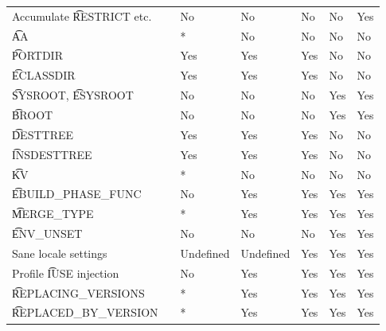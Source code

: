 \begin{landscape}
\begin{longtable}{llP{7.5em}P{7.5em}P{7.5em}P{7.5em}P{7.5em}}
Accumulate \t{RESTRICT} etc. &  &
    No & No & No & No & Yes \\

\t{AA} &  &
    * & No & No & No & No \\

\t{PORTDIR} &  &
    Yes & Yes & Yes & No & No \\

\t{ECLASSDIR} &  &
    Yes & Yes & Yes & No & No \\

\t{SYSROOT}, \t{ESYSROOT} &  &
    No & No & No & Yes & Yes \\

\t{BROOT} &  &
    No & No & No & Yes & Yes \\

\t{DESTTREE} &  &
    Yes & Yes & Yes & No & No \\

\t{INSDESTTREE} &  &
    Yes & Yes & Yes & No & No \\

\t{KV} &  &
    * & No & No & No & No \\

\t{EBUILD_PHASE_FUNC} &  &
    No & Yes & Yes & Yes & Yes \\

\t{MERGE_TYPE} &  &
    * & Yes & Yes & Yes & Yes \\

\t{ENV_UNSET} &  &
    No & No & No & Yes & Yes \\

Sane locale settings &  &
    Undefined & Undefined & Yes & Yes & Yes \\

Profile \t{IUSE} injection &  &
    No & Yes & Yes & Yes & Yes \\

\t{REPLACING_VERSIONS} &  &
    * & Yes & Yes & Yes & Yes \\

\t{REPLACED_BY_VERSION} &  &
    * & Yes & Yes & Yes & Yes \\


\end{longtable}
\end{landscape}
